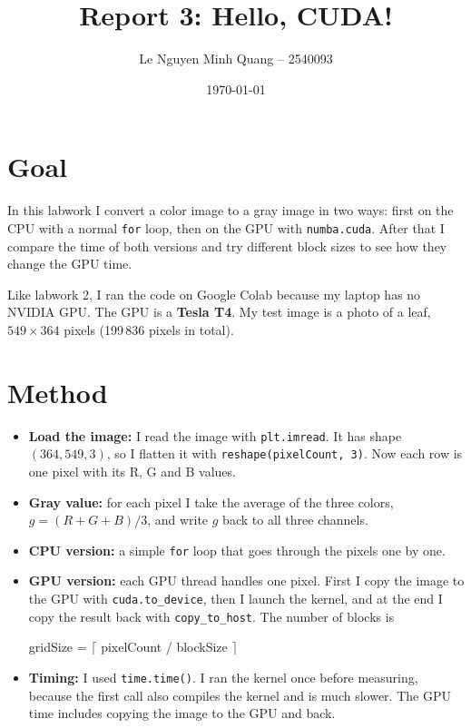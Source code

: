 \documentclass[11pt,a4paper]{article}
\title{Report 3: Hello, CUDA!}
\author{Le Nguyen Minh Quang -- 2540093}
\date{\today}
\begin{document}
\maketitle

\section{Goal}
In this labwork I convert a color image to a gray image in two ways:
first on the CPU with a normal \texttt{for} loop, then on the GPU with
\texttt{numba.cuda}. After that I compare the time of both versions and
try different block sizes to see how they change the GPU time.

Like labwork 2, I ran the code on Google Colab because my laptop has no
NVIDIA GPU. The GPU is a \textbf{Tesla T4}. My test image is a photo of a
leaf, $549 \times 364$ pixels (199\,836 pixels in total).

\section{Method}
\begin{itemize}
  \item \textbf{Load the image:} I read the image with
  \texttt{plt.imread}. It has shape $(364, 549, 3)$, so I flatten it
  with \texttt{reshape(pixelCount, 3)}. Now each row is one pixel with
  its R, G and B values.
  \item \textbf{Gray value:} for each pixel I take the average of the
  three colors, $g = (R + G + B) / 3$, and write $g$ back to all three
  channels.
  \item \textbf{CPU version:} a simple \texttt{for} loop that goes
  through the pixels one by one.
  \item \textbf{GPU version:} each GPU thread handles one pixel. First I
  copy the image to the GPU with \texttt{cuda.to\_device}, then I launch
  the kernel, and at the end I copy the result back with
  \texttt{copy\_to\_host}. The number of blocks is
  \begin{center}
    gridSize = $\lceil$ pixelCount / blockSize $\rceil$
  \end{center}
  \item \textbf{Timing:} I used \texttt{time.time()}. I ran the kernel
  once before measuring, because the first call also compiles the
  kernel and is much slower. The GPU time includes copying the image to
  the GPU and back.
\end{itemize}
\end{document}
